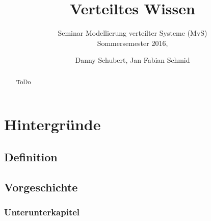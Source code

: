 \documentclass{llncs}
\begin{document}
\title{Verteiltes Wissen}
\subtitle{\small{ Seminar Modellierung verteilter Systeme (MvS)\\ Sommersemester 2016,}}
\author{Danny Schubert, Jan Fabian Schmid\\}
\maketitle

\begin{abstract}
ToDo
\end{abstract}

\section{Hintergründe}

\subsection{Definition}


\subsection{Vorgeschichte}	


\subsubsection{Unterunterkapitel}




\end{document}

